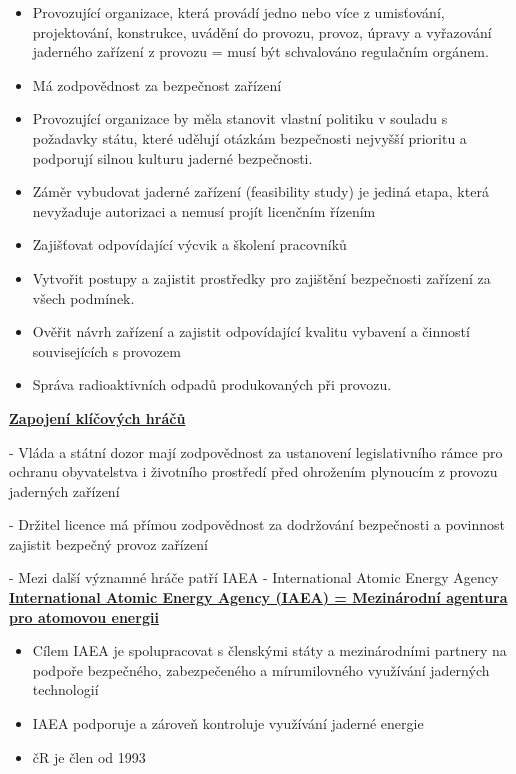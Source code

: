 \begin{itemize}
    \item Provozující organizace, která provádí jedno nebo více z umisťování, projektování, konstrukce, uvádění do provozu, provoz, úpravy a vyřazování jaderného zařízení z provozu = musí být schvalováno regulačním orgánem.
    \item Má zodpovědnost za bezpečnost zařízení
    \item Provozující organizace by měla stanovit vlastní politiku v souladu s požadavky státu, které udělují otázkám bezpečnosti nejvyšší prioritu a podporují silnou kulturu jaderné bezpečnosti.
    \item Záměr vybudovat jaderné zařízení (feasibility study) je jediná etapa, která nevyžaduje autorizaci a nemusí projít
licenčním řízením
    \item Zajišťovat odpovídající výcvik a školení pracovníků
    \item Vytvořit postupy a zajistit prostředky pro zajištění bezpečnosti zařízení za všech podmínek.
    \item Ověřit návrh zařízení a zajistit odpovídající kvalitu vybavení a činností souvisejících s provozem
    \item Správa radioaktivních odpadů produkovaných při provozu.
\end{itemize}



\underline{\textbf{Zapojení klíčových hráčů}}

\noindent - 	Vláda a státní dozor mají zodpovědnost za ustanovení legislativního rámce pro ochranu obyvatelstva i životního prostředí před ohrožením plynoucím z provozu jaderných zařízení

\noindent - 	Držitel licence má přímou zodpovědnost za dodržování bezpečnosti a povinnost zajistit bezpečný provoz zařízení

- Mezi další významné hráče patří IAEA - International Atomic Energy Agency
\\

\underline{\textbf{International Atomic Energy Agency (IAEA) = Mezinárodní agentura pro atomovou energii}}

\begin{itemize}
    \item Cílem IAEA je spolupracovat s členskými státy a mezinárodními partnery na podpoře bezpečného, zabezpečeného a mírumilovného využívání jaderných technologií
    \item IAEA podporuje a zároveň kontroluje využívání jaderné energie
    \item čR je člen od 1993
\end{itemize}


